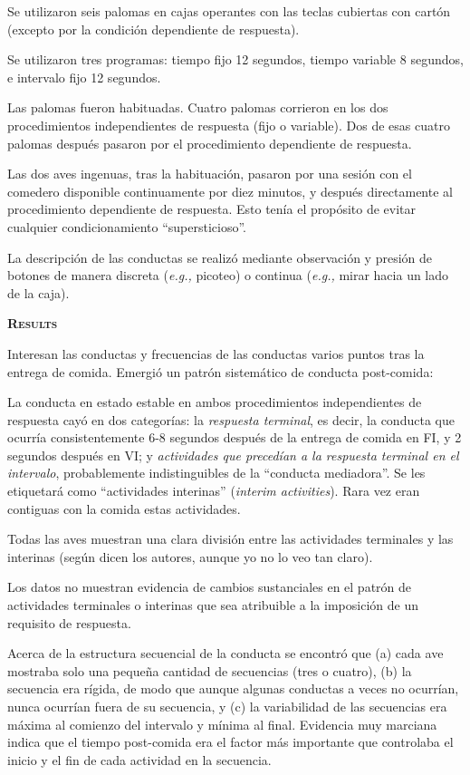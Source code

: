 \documentclass[a4paper,12pt]{article}
\begin{document}
Se utilizaron seis palomas en cajas operantes con las teclas cubiertas con cartón (excepto por la condición dependiente de respuesta).

Se utilizaron tres programas: tiempo fijo 12 segundos, tiempo variable 8 segundos, e intervalo fijo 12 segundos.

Las palomas fueron habituadas. Cuatro palomas corrieron en los dos procedimientos independientes de respuesta (fijo o variable). Dos de esas cuatro palomas después pasaron por el procedimiento dependiente de respuesta.

Las dos aves ingenuas, tras la habituación, pasaron por una sesión con el comedero disponible continuamente por diez minutos, y después directamente al procedimiento dependiente de respuesta. Esto tenía el propósito de evitar cualquier condicionamiento ``supersticioso''.

La descripción de las conductas se realizó mediante observación y presión de botones de manera discreta ({\itshape e.g.,} picoteo) o continua ({\itshape e.g.,} mirar hacia un lado de la caja).

{\scshape\bfseries Results}

Interesan las conductas y frecuencias de las conductas varios puntos tras la entrega de comida. Emergió un patrón sistemático de conducta post-comida:

La conducta en estado estable en ambos procedimientos independientes de respuesta cayó en dos categorías: la {\itshape respuesta terminal}, es decir, la conducta que ocurría consistentemente 6-8 segundos después de la entrega de comida en FI, y 2 segundos después en VI; y {\itshape actividades que precedían a la respuesta terminal en el intervalo}, probablemente indistinguibles de la ``conducta mediadora''. Se les etiquetará como ``actividades interinas'' ({\itshape interim activities}). Rara vez eran contiguas con la comida estas actividades.

Todas las aves muestran una clara división entre las actividades terminales y las interinas (según dicen los autores, aunque yo no lo veo tan claro).

Los datos no muestran evidencia de cambios sustanciales en el patrón de actividades terminales o interinas que sea atribuible a la imposición de un requisito de respuesta.

Acerca de la estructura secuencial de la conducta se encontró que (a) cada ave mostraba solo una pequeña cantidad de secuencias (tres o cuatro), (b) la secuencia era rígida, de modo que aunque algunas conductas a veces no ocurrían, nunca ocurrían fuera de su secuencia, y (c) la variabilidad de las secuencias era máxima al comienzo del intervalo y mínima al final. Evidencia muy marciana indica que el tiempo post-comida era el factor más importante que controlaba el inicio y el fin de cada actividad en la secuencia.
\end{document}
